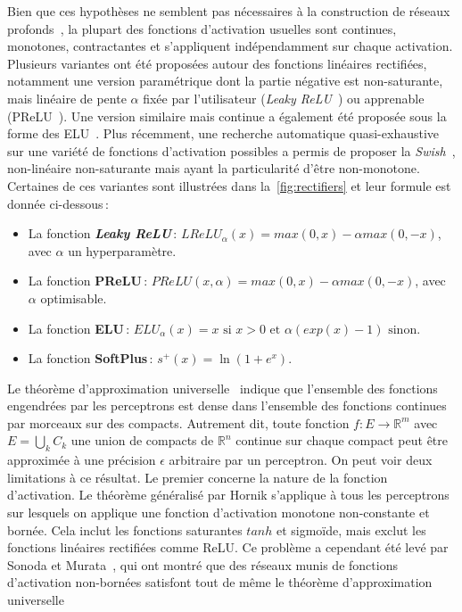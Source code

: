 Bien que ces hypothèses ne semblent pas nécessaires à la construction de réseaux profonds~\cite{oyallon_building_2017}, la plupart des fonctions d'activation usuelles sont continues, monotones, contractantes et s'appliquent indépendamment sur chaque activation. Plusieurs variantes ont été proposées autour des fonctions linéaires rectifiées, notamment une version paramétrique dont la partie négative est non-saturante, mais linéaire de pente $\alpha$ fixée par l'utilisateur (\emph{Leaky ReLU}~\cite{maas_rectifier_2013}) ou apprenable (\gls{PReLU}~\cite{he_delving_2015}). Une version similaire mais continue a également été proposée sous la forme des \gls{ELU}~\cite{clevert_fast_2015}. Plus récemment, une recherche automatique quasi-exhaustive sur une variété de fonctions d'activation possibles a permis de proposer la \emph{Swish}~\cite{ramachandran_searching_2018}, non-linéaire non-saturante mais ayant la particularité d'être non-monotone. Certaines de ces variantes sont illustrées dans la~\cref{fig:rectifiers} et leur formule est donnée ci-dessous\,:
\begin{itemize}
  \item La fonction \textbf{\emph{Leaky ReLU}}\,: $LReLU_\alpha(x) = max(0,x) - \alpha max(0,-x)$, avec $\alpha$ un hyperparamètre.
  \item La fonction \textbf{\gls{PReLU}}\,: $PReLU(x, \alpha) = max(0,x) - \alpha max(0,-x)$, avec $\alpha$ optimisable.
  \item La fonction \textbf{\gls{ELU}}\,: $ELU_\alpha(x) = x \text{ si } x > 0 \text{ et } \alpha (exp(x) - 1) \text{ sinon}$.
  \item La fonction \textbf{SoftPlus}\,: $s^+(x) = \ln(1 + e^x)$.
\end{itemize}

Le théorème d'approximation universelle~\cite{cybenko_approximation_1989,hornik_approximation_1991} indique que l'ensemble des fonctions engendrées par les perceptrons est dense dans l'ensemble des fonctions continues par morceaux sur des compacts. Autrement dit, toute fonction $f : E \rightarrow \mathbb{R}^m$ avec $E = \bigcup_k C_k$ une union de compacts de $\mathbb{R}^n$ continue sur chaque compact peut être approximée à une précision $\epsilon$ arbitraire par un perceptron. On peut voir deux limitations à ce résultat. Le premier concerne la nature de la fonction d'activation. Le théorème généralisé par Hornik s'applique à tous les perceptrons sur lesquels on applique une fonction d'activation monotone non-constante et bornée. Cela inclut les fonctions saturantes $tanh$ et sigmoïde, mais exclut les fonctions linéaires rectifiées comme \gls{ReLU}. Ce problème a cependant été levé par Sonoda et Murata~\cite{sonoda_neural_2017}, qui ont montré que des réseaux munis de fonctions d'activation non-bornées satisfont tout de même le théorème d'approximation universelle


